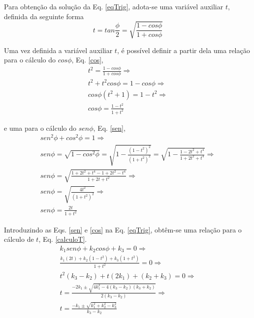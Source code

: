\documentclass[12pt]{article}
\begin{document}
	Para obtenção da solução da Eq. \ref{eqTrig}, adota-se uma variável auxiliar $ t $, definida da seguinte forma
	\begin{equation}
		t = tan \frac{\phi}{2} = \sqrt{\frac{1 - cos \phi}{1 + cos \phi}}
	\end{equation}
	
	Uma vez definida a variável auxiliar $ t $, é possível definir a partir dela uma relação para o cálculo do $ cos \phi $, Eq. \ref{cos},
	\begin{gather}
		t^2 = \frac{1 - cos \phi}{1 + cos \phi} \Rightarrow \nonumber\\
		t^2 + t^2 cos \phi = 1 - cos \phi \Rightarrow \nonumber\\
		cos \phi (t^2 + 1) = 1 - t^2 \Rightarrow \nonumber\\
		cos \phi = \frac{1 - t^2}{1 + t^2} \label{cos}
	\end{gather}
	
	\noindent e uma para o cálculo do $ sen \phi $, Eq. \ref{sen},
	\begin{gather}
		sen^2 \phi + cos^2 \phi = 1 \Rightarrow \nonumber\\
		sen \phi = \sqrt{1 - cos^2 \phi} = \sqrt{1 - \frac{(1 - t^2)^2}{(1 + t^2)^2}} = \sqrt{1 - \frac{1 - 2t^2 + t^4}{1 + 2t^2 + t^4}}\Rightarrow \nonumber\\
		sen \phi = \sqrt{\frac{1 + 2t^2 + t^4 - 1 + 2 t^2 - t^4}{1 + 2t + t^2}} \Rightarrow \nonumber\\
		sen \phi = \sqrt{\frac{4t^2}{(1 + t^2)^2}} \Rightarrow \nonumber\\
		sen \phi = \frac{2t}{1 + t^2} \label{sen}
	\end{gather}

	Introduzindo as Eqs. \ref{sen} e \ref{cos} na Eq. \ref{eqTrig}, obtêm-se uma relação para o cálculo de $ t $, Eq. \ref{calculoT}.
	\begin{gather}
		k_1 sen \phi + k_2 cos \phi + k_3 = 0 \nonumber \Rightarrow \\
		\frac{k_1 (2t) + k_2 (1 - t^2) + k_3 (1 + t^2)}{1 + t^2} = 0 \nonumber \Rightarrow \\
		t^2 (k_3 - k_2) + t (2 k_1) + (k_2 + k_3) = 0 \nonumber \Rightarrow \\
		t = \frac{-2 k_1 \pm \sqrt{4k_1^2 - 4(k_3 - k_2)(k_3 + k_2)}}{2 (k_3 - k_2)} \nonumber \Rightarrow \\
		t = \frac{-k_1 \pm \sqrt{k_1^2 + k_2^2 - k_3^2}}{k_3 - k_2} \label{calculoT}
	\end{gather}
\end{document}
